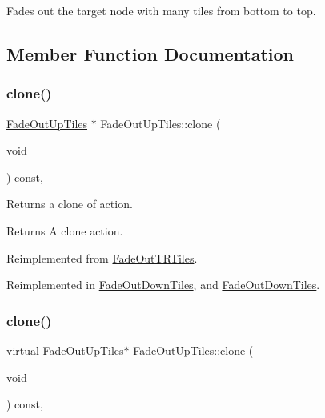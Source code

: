 Fades out the target node with many tiles from bottom to top. 

\subsection{Member Function Documentation}
\mbox{\label{classFadeOutUpTiles_aa408cee44da1d5e8ebb41063d58a0de9}} 
\subsubsection{\texorpdfstring{clone()}{clone()}\hspace{0.1cm}{\footnotesize\ttfamily [1/2]}}
{\footnotesize\ttfamily \hyperlink{classFadeOutUpTiles}{Fade\+Out\+Up\+Tiles} $\ast$ Fade\+Out\+Up\+Tiles\+::clone (\begin{DoxyParamCaption}\item[{void}]{ }\end{DoxyParamCaption}) const\hspace{0.3cm}{\ttfamily [override]}, {\ttfamily [virtual]}}

Returns a clone of action.

\begin{DoxyReturn}{Returns}
A clone action. 
\end{DoxyReturn}


Reimplemented from \hyperlink{classFadeOutTRTiles_af7a6bf6cfa4ef6cccae911b026e49b48}{Fade\+Out\+T\+R\+Tiles}.



Reimplemented in \hyperlink{classFadeOutDownTiles_aa7b17d06be4e0d54a401464fd3edcee1}{Fade\+Out\+Down\+Tiles}, and \hyperlink{classFadeOutDownTiles_a4a35c11502bbb834d6d4137cb03d2843}{Fade\+Out\+Down\+Tiles}.

\mbox{\label{classFadeOutUpTiles_af0311f93b8155bb8cd59db4320d630a0}} 
\subsubsection{\texorpdfstring{clone()}{clone()}\hspace{0.1cm}{\footnotesize\ttfamily [2/2]}}
{\footnotesize\ttfamily virtual \hyperlink{classFadeOutUpTiles}{Fade\+Out\+Up\+Tiles}$\ast$ Fade\+Out\+Up\+Tiles\+::clone (\begin{DoxyParamCaption}\item[{void}]{ }\end{DoxyParamCaption}) const\hspace{0.3cm}{\ttfamily [override]}, {\ttfamily [virtual]}}

